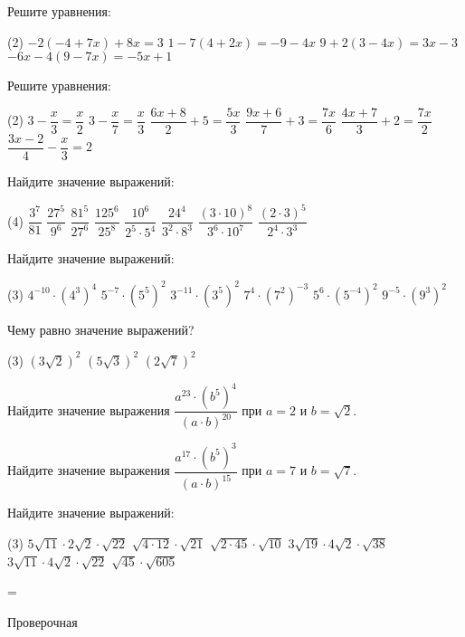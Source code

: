 \begin{class}[number=7]
	\begin{listofex}
		\item Решите уравнения:
		\begin{tasks}(2)
			\task \( -2(-4+7x)+8x=3 \)
			\task \( 1-7(4+2x)=-9-4x \)
			\task \( 9+2(3-4x)=3x-3 \)
			\task \( -6x-4(9-7x)=-5x+1 \)
		\end{tasks}
		\item Решите уравнения:
		\begin{tasks}(2)
			\task \( 3-\dfrac{x}{3}=\dfrac{x}{2} \)
			\task \( 3-\dfrac{x}{7}=\dfrac{x}{3} \)
			\task \( \dfrac{6x+8}{2}+5=\dfrac{5x}{3} \)
			\task \( \dfrac{9x+6}{7}+3=\dfrac{7x}{6} \)
			\task \( \dfrac{4x+7}{3}+2=\dfrac{7x}{2} \)
			\task \( \dfrac{3x-2}{4}-\dfrac{x}{3}=2 \)
		\end{tasks}
		\item Найдите значение выражений:
		\begin{tasks}(4)
			\task \( \dfrac{3^7}{81} \)
			\task \( \dfrac{27^5}{9^6} \)
			\task \( \dfrac{81^5}{27^6} \)
			\task \( \dfrac{125^6}{25^8} \)
			\task \( \dfrac{10^6}{2^5\cdot5^4} \)
			\task \( \dfrac{24^4}{3^2\cdot8^3} \)
			\task \( \dfrac{(3\cdot10)^8}{3^6\cdot10^7} \)
			\task \( \dfrac{(2\cdot3)^5}{2^4\cdot3^3} \)
		\end{tasks}
		\item Найдите значение выражений:
		\begin{tasks}(3)
			\task \( 4^{-10}\cdot(4^3)^4 \)
			\task \( 5^{-7}\cdot(5^5)^2 \)
			\task \( 3^{-11}\cdot(3^5)^2 \)
			\task \( 7^4\cdot(7^2)^{-3} \)
			\task \( 5^6\cdot(5^{-4})^2 \)
			\task \( 9^{-5}\cdot(9^3)^2 \)
		\end{tasks}
		\item Чему равно значение выражений?
		\begin{tasks}(3)
			\task \( (3\sqrt{2})^2 \)
			\task \( (5\sqrt{3})^2 \)
			\task \( (2\sqrt{7})^2 \)
		\end{tasks}
		\item Найдите значение выражения \( \dfrac{a^{23}\cdot(b^5)^4}{(a\cdot b)^{20}} \) при \( a=2 \) и \( b=\sqrt{2} \).
		\item Найдите значение выражения \( \dfrac{a^{17}\cdot(b^5)^3}{(a\cdot b)^{15}} \) при \( a=7 \) и \( b=\sqrt{7} \).
		\item Найдите значение выражений:
		\begin{tasks}(3)
			\task \( 5\sqrt{11}\cdot2\sqrt{2}\cdot\sqrt{22} \)
			\task \( \sqrt{4\cdot12}\cdot\sqrt{21} \)
			\task \( \sqrt{2\cdot45}\cdot\sqrt{10} \)
			\task \( 3\sqrt{19}\cdot4\sqrt{2}\cdot\sqrt{38} \)
			\task \( 3\sqrt{11}\cdot4\sqrt{2}\cdot\sqrt{22} \)
			\task \( \sqrt{45}\cdot\sqrt{605} \)
		\end{tasks}
	\end{listofex}
\end{class}

=%
\begin{exam}
	\begin{listofex}
		\item Проверочная
	\end{listofex}
\end{exam}
